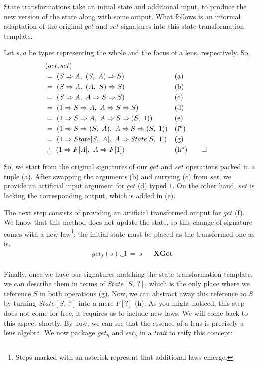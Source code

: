 \documentclass[preview, 3p]{elsarticle}
\begin{document}
State transformations take an initial state and additional input, to produce the
new version of the state along with some output. What follows is an informal
adaptation of the original $get$ and $set$ signatures into this state
transformation template.

\begin{remark}
  Let $s, a$ be types representing the whole and the focus of a lens,
  respectively. So,
  \begin{align*}
    &  (get, set) \\
    &=\ (S \Rightarrow A,\ (S,\ A) \Rightarrow S) &&\text{(a)} \\
    &=\ (S \Rightarrow A,\ (A,\ S) \Rightarrow S) &&\text{(b)} \\
    &=\ (S \Rightarrow A,\ A \Rightarrow S \Rightarrow S) &&\text{(c)} \\
    &=\ (1 \Rightarrow S \Rightarrow A,\ A \Rightarrow S \Rightarrow S) &&\text{(d)} \\
    &=\ (1 \Rightarrow S \Rightarrow A,\ A \Rightarrow S \Rightarrow (S,\ 1)) &&\text{(e)} \\
    &=\ (1 \Rightarrow S \Rightarrow (S,\ A),\ A \Rightarrow S \Rightarrow (S,\ 1)) &&\text{(f*)} \\
    &=\ (1 \Rightarrow State[S,\ A],\ A \Rightarrow State[S,\ 1]) &&\text{(g)} \\
    &\therefore\ (1 \Rightarrow F[A],\ A \Rightarrow F[1]) &&\text{(h*)}\qedhere
  \end{align*}
\end{remark}

So, we start from the original signatures of our $get$ and $set$ operations
packed in a tuple (a). After swapping the arguments (b) and currying (c) from
$set$, we provide an artificial input argument for $get$ (d) typed $1$. On the
other hand, $set$ is lacking the corresponding output, which is added in (e).

The next step consists of providing an artificial transformed output for $get$
(f). We know that this method does not update the state, so this change of
signature comes with a new law\footnote{Steps marked with an asterisk represent
that additional laws emerge.}: the initial state must be placed as the
transformed one as is.
\begin{align*}
  & get_f(s).\_1\ =\ s &&\textbf{XGet} \\
\end{align*}

Finally, once we have our signatures matching the state transformation template,
we can describe them in terms of $State[S,\ ?]$, which is the only place where
we reference $S$ in both operations (g). Now, we can abstract away this
reference to $S$ by turning $State[S,\ ?]$ into a mere $F[?]$ (h). As you might
noticed, this step does not come for free, it requires us to include new laws.
We will come back to this aspect shortly. By now, we can see that the essence of
a lens is precisely a lens algebra. We now package $get_h$ and $set_h$ in a
\emph{trait} to reify this concept:
\end{document}
